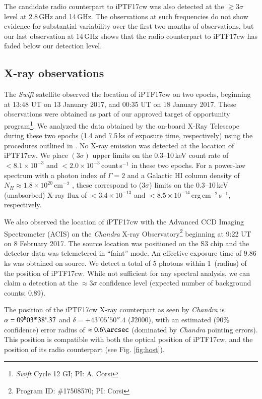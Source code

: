 \documentclass[twocolumn]{emulateapj}
\begin{document}
The candidate radio 
counterpart to iPTF17cw was also detected at the $\gtrsim 3\sigma$ level at 2.8\,GHz and 14\,GHz. The observations at such frequencies do not show
evidence for substantial variability over the first two months of observations, but our last observation at 14\,GHz shows that the radio counterpart to iPTF17cw has faded below our detection level.

\subsection{X-ray observations}
\label{X-rayobservations}
The \textit{Swift} satellite \citep{gcg+04} observed the location of 
iPTF17cw on two epochs, beginning at 13:48 UT on 13 January
2017, and 00:35 UT on 18 January 2017.  These observations were 
obtained as part of our approved target of opportunity program\footnote{\textit{Swift} Cycle 12 GI; PI: A. Corsi}. 
We analyzed the data obtained
by the on-board X-Ray Telescope \citep[XRT;][]{bhn+05} during these
two epochs (1.4 and 7.5\,ks of exposure time, respectively) using
the procedures outlined in \citet{ebp+09}.  No X-ray emission was
detected at the location of iPTF17cw.  We place $(3\sigma)$ upper limits on the
0.3--10\,keV count rate of $< 8.1 \times 10^{-3}$ and $< 2.0 \times
10^{-3}$\,count\,s$^{-1}$ in these two epochs.  For a power-law spectrum
with a photon index of $\Gamma = 2$ and a Galactic HI column density of 
$N_H\approx 1.8\times10^{20}$\,cm$^{-2}$ \citep{Dickey1990}, these correspond to (3$\sigma$)
limits on the 0.3--10\,keV (unabsorbed) X-ray flux of $< 3.4 \times 10^{-13}$
and $< 8.5 \times 10^{-14}$\,erg\,cm$^{-2}$\,s$^{-1}$, respectively.

We also observed the location of iPTF17cw with the Advanced CCD Imaging
Spectrometer (ACIS) on the \textit{Chandra} X-ray Observatory\footnote{Program ID: \#17508570; PI: 
Corsi} beginning at 9:22 UT on 8 February 2017.  The source location was positioned on the S3 chip and the 
detector data was telemetered in ``faint'' mode.  An effective
exposure time of 9.86\,ks was obtained on source. We detect a total of 5 photons within 1\arcsec\ (radius) of the 
position of iPTF17cw.  While not sufficient for any spectral 
analysis, we can claim a detection at the $\approx 3\sigma$ confidence level (expected number of background counts: 0.89).

The position of the iPTF17cw X-ray counterpart as seen by \textit{Chandra} is $\alpha=09^{\rm h}03^{\rm m}38^{\rm s}.37$ and $\delta=+43^{\circ}05'50''.4$ (J2000), with an estimated (90\% confidence) 
error radius of $\approx 0.6\arcsec$ (dominated by \textit{Chandra} pointing errors). This position is compatible with both the optical position of iPTF17cw, and the position of its radio counterpart (see Fig. \ref{fig:host}).
\end{document}
